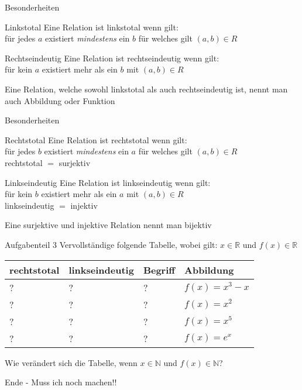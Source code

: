 \documentclass[18pt]{beamer}
\begin{document}
\begin{frame}{Besonderheiten}
\begin{block}{Linkstotal}
Eine Relation ist linkstotal wenn gilt:\\
	f\"ur jedes $a$ existiert \textit{mindestens} ein $b$ f\"ur welches gilt $(a, b) \in R$
\end{block}

\begin{block}{Rechtseindeutig}
Eine Relation ist rechtseindeutig wenn gilt:\\
	f\"ur kein $a$ existiert mehr als ein $b$ mit $(a, b) \in R$
\end{block}

\begin{block}{}
Eine Relation, welche sowohl linkstotal als auch rechtseindeutig ist, nennt man auch Abbildung oder Funktion
\end{block}
\end{frame}


\begin{frame}{Besonderheiten}
\begin{block}{Rechtstotal}
Eine Relation ist rechtstotal wenn gilt:\\
	f\"ur jedes $b$ existiert \textit{mindestens} ein $a$ f\"ur welches gilt $(a, b) \in R$\\
	rechtstotal $=$ surjektiv
\end{block}

\begin{block}{Linkseindeutig}
Eine Relation ist linkseindeutig wenn gilt:\\
	f\"ur kein $b$ existiert mehr als ein $a$ mit $(a, b) \in R$\\
	linkseindeutig $=$ injektiv
\end{block}

\begin{block}{}
Eine surjektive und injektive Relation nennt man bijektiv
\end{block}
\end{frame}


\begin{frame}{Aufgabenteil 3}
Vervollst\"andige folgende Tabelle, wobei gilt:
$x \in \mathbb{R}$ und $f(x) \in \mathbb{R}$\\

\begin{block}{}
\begin{tabular}{llll}
	\hline
	\textbf{rechtstotal} & \textbf{linkseindeutig} & \textbf{Begriff} & \textbf{Abbildung} \\
	\hline
	? & ? & ? & $f(x) = x^3-x$\\
	? & ? & ? & $f(x) = x^2$\\
	? & ? & ? & $f(x) = x^5$\\
	? & ? & ? & $f(x) = e^{x}$\\
	\hline
\end{tabular}
\end{block}

\pause
Wie ver\"andert sich die Tabelle, wenn $x \in \mathbb{N}$ und $f(x) \in \mathbb{N}$?
\end{frame}

\begin{frame}
	Ende - Muss ich noch machen!!
\end{frame}
\end{document}
